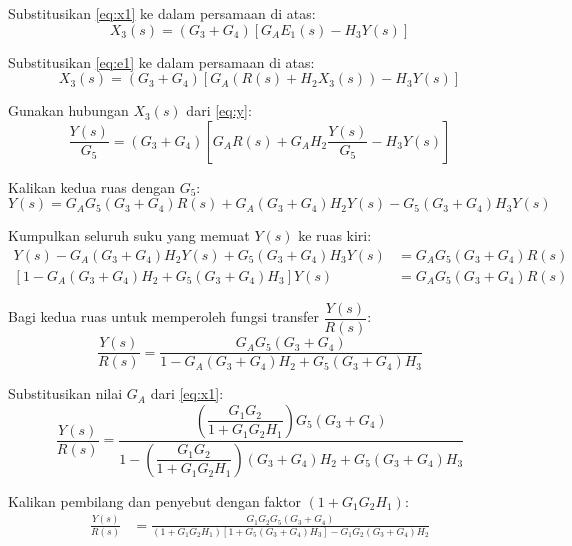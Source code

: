 \documentclass[11pt,a4paper]{article}
\begin{document}
Substitusikan \eqref{eq:x1} ke dalam persamaan di atas:
\begin{equation*}
    X_3(s) = (G_3 + G_4) \left[ G_A E_1(s) - H_3 Y(s) \right]
\end{equation*}

Substitusikan \eqref{eq:e1} ke dalam persamaan di atas:
\begin{equation*}
    X_3(s) = (G_3 + G_4) \left[ G_A \left( R(s) + H_2 X_3(s) \right) - H_3 Y(s) \right]
\end{equation*}

Gunakan hubungan $X_3(s)$ dari \eqref{eq:y}:
\begin{equation*}
    \frac{Y(s)}{G_5} = (G_3 + G_4) \left[ G_A R(s) + G_A H_2 \frac{Y(s)}{G_5} - H_3 Y(s) \right]
\end{equation*}

Kalikan kedua ruas dengan $G_5$:
\begin{equation*}
    Y(s) = G_A G_5 (G_3 + G_4) R(s) + G_A (G_3 + G_4) H_2 Y(s) - G_5 (G_3 + G_4) H_3 Y(s)
\end{equation*}

Kumpulkan seluruh suku yang memuat $Y(s)$ ke ruas kiri:
\begin{align*}
    Y(s) - G_A (G_3 + G_4) H_2 Y(s) + G_5 (G_3 + G_4) H_3 Y(s) &= G_A G_5 (G_3 + G_4) R(s) \\
    \left[ 1 - G_A (G_3 + G_4) H_2 + G_5 (G_3 + G_4) H_3 \right] Y(s) &= G_A G_5 (G_3 + G_4) R(s)
\end{align*}

Bagi kedua ruas untuk memperoleh fungsi transfer $\dfrac{Y(s)}{R(s)}$:
\begin{equation*}
    \frac{Y(s)}{R(s)} = \frac{G_A G_5 (G_3 + G_4)}{1 - G_A (G_3 + G_4) H_2 + G_5 (G_3 + G_4) H_3}
\end{equation*}

Substitusikan nilai $G_A$ dari \eqref{eq:x1}:
\begin{equation*}
    \frac{Y(s)}{R(s)} = \frac{\left( \dfrac{G_1 G_2}{1 + G_1 G_2 H_1} \right) G_5 (G_3 + G_4)}{1 - \left( \dfrac{G_1 G_2}{1 + G_1 G_2 H_1} \right) (G_3 + G_4) H_2 + G_5 (G_3 + G_4) H_3}
\end{equation*}

Kalikan pembilang dan penyebut dengan faktor $(1 + G_1 G_2 H_1)$:
\begin{align*}
    \frac{Y(s)}{R(s)} &= \frac{G_1 G_2 G_5 (G_3 + G_4)}{(1 + G_1 G_2 H_1)\left[ 1 + G_5 (G_3 + G_4) H_3 \right] - G_1 G_2 (G_3 + G_4) H_2}
\end{align*}
\end{document}
